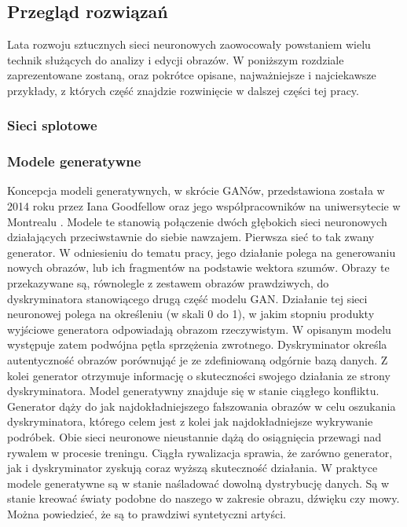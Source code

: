 \chapter{}

  \section{Przegląd rozwiązań}
  \tab Lata rozwoju sztucznych sieci neuronowych zaowocowały powstaniem wielu technik służących do analizy i edycji obrazów. W poniższym rozdziale zaprezentowane zostaną, oraz pokrótce opisane, najważniejsze i najciekawsze przykłady, z których część znajdzie rozwinięcie w dalszej części tej pracy.

  \subsection{Sieci splotowe}
  \tab

  \subsection{Modele generatywne}
  \tab Koncepcja modeli generatywnych, w skrócie GANów, przedstawiona została w 2014 roku przez Iana Goodfellow oraz jego współpracowników na uniwersytecie w Montrealu \cite{gan}. Modele te stanowią połączenie dwóch głębokich sieci neuronowych działających przeciwstawnie do siebie nawzajem.
  \newline \tab Pierwsza sieć to tak zwany generator. W odniesieniu do tematu pracy, jego działanie polega na generowaniu nowych obrazów, lub ich fragmentów na podstawie wektora szumów.
  \newline \tab Obrazy te przekazywane są, równolegle z zestawem obrazów prawdziwych, do dyskryminatora stanowiącego drugą część modelu GAN. Działanie tej sieci neuronowej polega na określeniu (w skali 0 do 1), w jakim stopniu produkty wyjściowe generatora odpowiadają obrazom rzeczywistym.
  \newline \tab W opisanym modelu występuje zatem podwójna pętla sprzężenia zwrotnego. Dyskryminator określa autentyczność obrazów porównująć je ze zdefiniowaną odgórnie bazą danych. Z kolei generator otrzymuje informację o skuteczności swojego działania ze strony dyskryminatora.
  \newline \tab Model generatywny znajduje się w stanie ciągłego konfliktu. Generator dąży do jak najdokładniejszego fałszowania obrazów w celu oszukania dyskryminatora, którego celem jest z kolei jak najdokładniejsze wykrywanie podróbek. Obie sieci neuronowe nieustannie dążą do osiągnięcia przewagi nad rywalem w procesie treningu. Ciągła rywalizacja sprawia, że zarówno generator, jak i dyskryminator zyskują coraz wyższą skuteczność działania.
  \newline \tab W praktyce modele generatywne są w stanie naśladować dowolną dystrybucję danych. Są w stanie kreować światy podobne do naszego w zakresie obrazu, dźwięku czy mowy. Można powiedzieć, że są to prawdziwi syntetyczni artyści.
